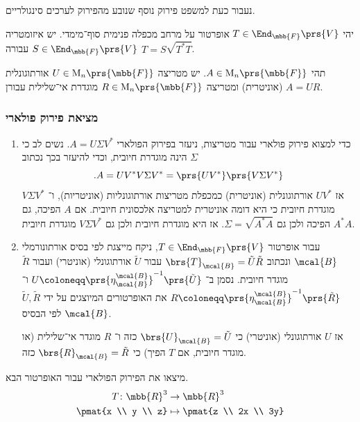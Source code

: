 \documentclass[a4paper,10pt,twoside,openany]{book}
\renewcommand{\Mat}{\mathrm{M}}
\begin{document}
נעבור כעת למשפט פירוק נוסף שנובע מהפירוק לערכים סינגולריים.

\begin{theorem}
יהי
$T \in \End_{\mbb{F}}\prs{V}$
אופרטור על מרחב מכפלה פנימית סוף־מימדי. יש איזומטריה
$S \in \End_{\mbb{F}}\prs{V}$
עבורה
$T = S \sqrt{T^* T}$.
\end{theorem}

\begin{theorem}
תהי
$A \in \Mat_n\prs{\mbb{F}}$.
יש מטריצה
$U \in \Mat_n\prs{\mbb{F}}$
אורתוגונלית (אוניטרית) ומטריצה
$R \in \Mat_n\prs{\mbb{F}}$
מוגדרת אי־‏שלילית עבורן
$A = UR$.
\end{theorem}

\subsubsection{מציאת פירוק פולארי}

\begin{enumerate}
\item
כדי למצוא פירוק פולארי עבור מטריצות, ניעזר בפירוק הפולארי
$A = U \Sigma V^*$.
נשים לב כי
$\Sigma$
הינה מוגדרת חיובית, וכדי להיעזר בכך נכתוב
\[\text{.} A = U V^* V \Sigma V^* = \prs{U V^*} \prs{V \Sigma V^*}\]
אז
$U V^*$
אורתוגונלית (אוניטרית) כמכפלת מטריצות אורתוגונליות (אוניטריות), ו־%
$V \Sigma V^*$
מוגדרת חיובית כי היא דומה אוניטרית למטריצה אלכסונית חיובית.
אם
$A$
הפיכה, גם
$A^* A$
הפיכה ולכן גם
$\Sigma = \sqrt{A^* A}$.
אז היא מוגדרת חיובית ולכן גם
$V \Sigma V^*$
מוגדרת חיובית.

\item
עבור אופרטור
$T \in \End_{\mbb{F}}\prs{V}$,
ניקח מייצגת לפי בסיס אורתונורמלי
$\mcal{B}$
ונכתוב
$\brs{T}_\mcal{B} = \tilde{U} \tilde{R}$
עבור
$\tilde{U}$
אורתוגונלי (אוניטרי) ועבור
$\tilde{R}$
מוגדר חיובית. נסמן ב־%
$U \coloneqq \prs{\eta^\mcal{B}_\mcal{B}}^{-1}\prs{\tilde{U}}$
ו־%
$R \coloneqq \prs{\eta^\mcal{B}_\mcal{B}}^{-1}\prs{\tilde{R}}$
את האופרטורים המיוצגים על ידי
$\tilde{U}, \tilde{R}$
לפי הבסיס
$\mcal{B}$.

אז
$U$
אורתוגונלי (אוניטרי) כי
$\brs{U}_\mcal{B} = \tilde{U}$
כזה ו־%
$R$
מוגדר אי־שלילית (או מוגדר חיובית, אם
$T$
הפיך) כי
$\brs{R}_\mcal{B} = \tilde{R}$
כזה.
\end{enumerate}

\begin{exercisechap}
מיצאו את הפירוק הפולארי עבור האופרטור הבא.
\begin{align*}
T \colon \mbb{R}^3 &\to \mbb{R}^3 \\
\pmat{x \\ y \\ z} &\mapsto \pmat{z \\ 2x \\ 3y}
\end{align*}
\end{exercisechap}
\end{document}
